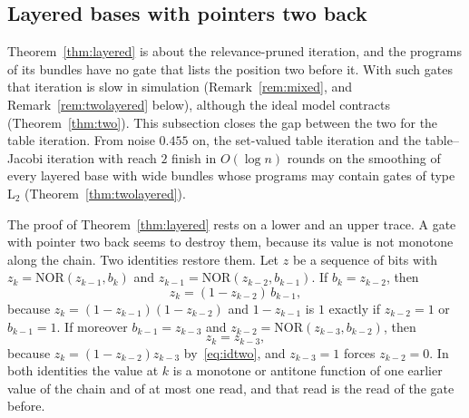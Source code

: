 \documentclass[11pt]{amsart}
\theoremstyle{definition}
\theoremstyle{remark}
\newcommand{\NOR}{\mathrm{NOR}}
\begin{document}
\subsection{Layered bases with pointers two back}\label{sec:twolayered}

Theorem~\ref{thm:layered} is about the relevance-pruned iteration, and the programs of its
bundles have no gate that lists the position two before it. With such gates that iteration is
slow in simulation (Remark~\ref{rem:mixed}, and Remark~\ref{rem:twolayered} below), although
the ideal model contracts (Theorem~\ref{thm:two}). This subsection closes the gap between the
two for the table iteration. From noise $0.455$ on, the set-valued table iteration and the
table--Jacobi iteration with reach $2$ finish in $O(\log n)$ rounds on the smoothing of every
layered base with wide bundles whose programs may contain gates of type $\mathrm L_2$
(Theorem~\ref{thm:twolayered}).

The proof of Theorem~\ref{thm:layered} rests on a lower and an upper trace. A gate with pointer
two back seems to destroy them, because its value is not monotone along the chain. Two
identities restore them. Let $z$ be a sequence of bits with $z_k=\NOR(z_{k-1},b_k)$ and
$z_{k-1}=\NOR(z_{k-2},b_{k-1})$. If $b_k=z_{k-2}$, then
\begin{equation}\label{eq:idtwo}
z_k=(1-z_{k-2})\,b_{k-1},
\end{equation}
because $z_k=(1-z_{k-1})(1-z_{k-2})$ and $1-z_{k-1}$ is $1$ exactly if $z_{k-2}=1$ or
$b_{k-1}=1$. If moreover $b_{k-1}=z_{k-3}$ and $z_{k-2}=\NOR(z_{k-3},b_{k-2})$, then
\begin{equation}\label{eq:idthree}
z_k=z_{k-3},
\end{equation}
because $z_k=(1-z_{k-2})z_{k-3}$ by~\eqref{eq:idtwo}, and $z_{k-3}=1$ forces $z_{k-2}=0$. In
both identities the value at $k$ is a monotone or antitone function of one earlier value of the
chain and of at most one read, and that read is the read of the gate before.
\end{document}
